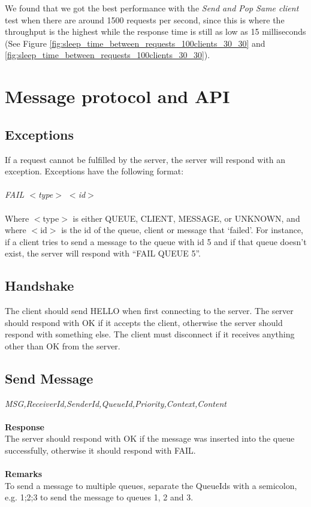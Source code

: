 \documentclass{article}
\begin{document}
        We found that we got the best performance with the \textit{Send and Pop Same client} test when there are around 1500 requests per second, since this is where the throughput is the highest while the response time is still as low as 15 milliseconds (See Figure \ref{fig:sleep_time_between_requests_100clients_30_30} and \ref{fig:sleep_time_between_requests_100clients_30_30}).
    \clearpage
    \appendix
        \section{Message protocol and API}
        \label{sec:message_protocol_api}
            \subsection{Exceptions}
                If a request cannot be fulfilled by the server, the server will respond with an exception.  Exceptions have the following format:\\
                \\
                \indent\textit{FAIL $<$type$>$ $<$id$>$}\\
                \\
                Where $<$type$>$ is either QUEUE, CLIENT, MESSAGE, or UNKNOWN, and where $<$id$>$ is the id of the queue, client or message that ‘failed’. For instance, if a client tries to send a message to the queue with id 5 and if that queue doesn’t exist, the server will respond with “FAIL QUEUE 5”.

            \subsection{Handshake}
                The client should send HELLO when first connecting to the server. The server should respond with OK if it accepts the client, otherwise the server should respond with something else. The client must disconnect if it receives anything other than OK from the server.


            \subsection{Send Message}
                \indent\indent\textit{MSG,ReceiverId,SenderId,QueueId,Priority,Context,Content}\\
                \\
                \textbf{Response}\\
                The server should respond with OK if the message was inserted into the queue successfully, otherwise it should respond with FAIL.\\
                \\
                \textbf{Remarks}\\
                To send a message to multiple queues, separate the QueueIds with a semicolon, e.g. 1;2;3 to send the message to queues 1, 2 and 3.
\end{document}
